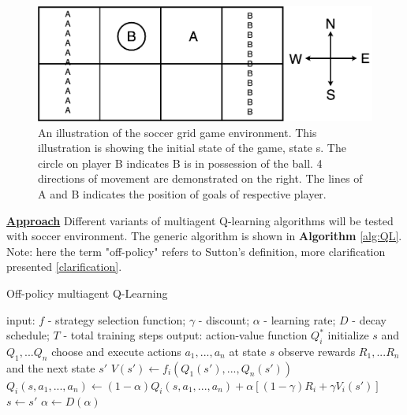 \documentclass[10pt]{article}
\begin{document}
\begin{figure}[h!]
  \centering
  \includegraphics[width=0.65\linewidth]{diagram/soccer.png}
    \caption{An illustration of the soccer grid game environment. This illustration is showing the initial state of the game, state s. The circle on player B indicates B is in possession of the ball. 4 directions of movement are demonstrated on the right. The lines of A and B indicates the position of goals of respective player.}
  \label{fig:soccer}
\end{figure}

\bigbreak
\noindent
\ul{\textbf{Approach}} Different variants of multiagent Q-learning algorithms will be tested with soccer environment. The generic algorithm\cite{GreenwaldCorrelatedQLearning2003} is shown in \textbf{Algorithm} \ref{alg:QL}. Note: here the term "off-policy" refers to Sutton's definition, more clarification presented \ref{clarification}.

\begin{algorithm}
\caption{Off-policy multiagent Q-Learning}\label{alg:QL}
\begin{algorithmic}
\STATE input: $f$ - strategy selection function; $\gamma$ - discount; $\alpha$ - learning rate; $D$ - decay schedule; $T$ - total training steps
\STATE output: action-value function $Q_i^*$
\STATE initialize $s$ and $Q_1,...Q_n$
\STATE choose and execute actions $a_1,...,a_n$ at state $s$
\STATE observe rewards $R_1,...R_n$ and the next state $s'$
\STATE $V(s')\leftarrow f_i(Q_1(s'),...,Q_n(s'))$
\STATE $Q_i(s,a_1,...,a_n)\leftarrow(1-\alpha)Q_i(s,a_1,...,a_n)+\alpha[(1-\gamma)R_i+\gamma V_i(s')]$
\ENDFOR
\STATE $s\leftarrow s'$
\STATE $\alpha\leftarrow D(\alpha)$
\ENDFOR
\end{algorithmic}
\end{algorithm}
\end{document}

